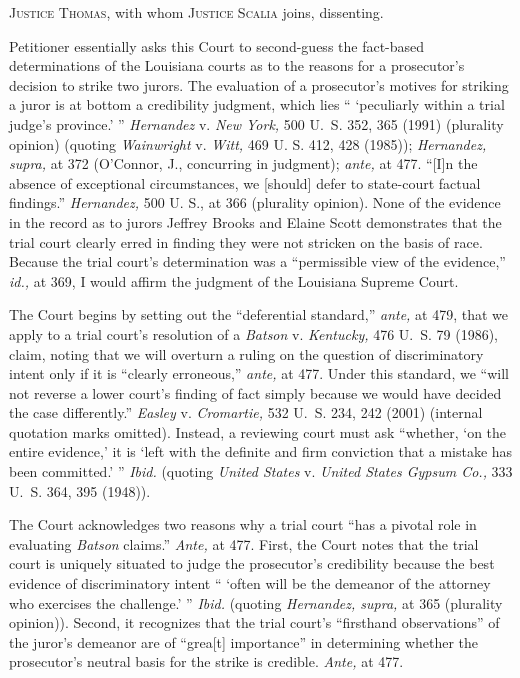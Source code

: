 
\setcounter{page}{486}

  \textsc{Justice Thomas,} with whom \textsc{Justice Scalia} joins, dissenting.

  Petitioner essentially asks this Court to second-guess the fact-based
determinations of the Louisiana courts as to the reasons for a
prosecutor's decision to strike two jurors. The evaluation of a
prosecutor's motives for striking a juror is at bottom a credibility
judgment, which lies `` ‘peculiarly within a trial judge's
province.' '' \emph{Hernandez} v. \emph{New York,} 500 U.~S. 352, 365
(1991) (plurality opinion) (quoting \emph{Wainwright} v. \emph{Witt,} 469
U. S. 412, 428 (1985)); \emph{Hernandez, supra,} at 372 (O'Connor, J.,
concurring in judgment); \emph{ante,} at 477. ``[I]n the absence of
exceptional circumstances, we [should] defer to state-court factual
findings.'' \emph{Hernandez,} 500 U. S., at 366 (plurality opinion).
None of the evidence in the record as to jurors Jeffrey Brooks and
Elaine Scott demonstrates that the trial court clearly erred in finding
they were not stricken on the basis of race. Because the trial court's
determination was a ``permissible view of the evidence,'' \emph{id.,}
at 369, I would affirm the judgment of the Louisiana Supreme Court.

  The Court begins by setting out the ``deferential standard,''
\emph{ante,} at 479, that we apply to a trial court's resolution of
a \emph{Batson} v. \emph{Kentucky,} 476 U.~S. 79 (1986), claim, noting
that we will overturn a ruling on the question of discriminatory intent
only if it is ``clearly erroneous,'' \emph{ante,} at 477. Under this
standard, we ``will not reverse a lower court's \newpage  finding of
fact simply because we would have decided the case differently.''
\emph{Easley} v. \emph{Cromartie,} 532 U.~S. 234, 242 (2001) (internal
quotation marks omitted). Instead, a reviewing court must ask
``whether, ‘on the entire evidence,' it is ‘left with the
definite and firm conviction that a mistake has been committed.' ''
\emph{Ibid.} (quoting \emph{United States} v. \emph{United States Gypsum Co.,}
333 U.~S. 364, 395 (1948)).

  The Court acknowledges two reasons why a trial court ``has a pivotal
role in evaluating \emph{Batson} claims.'' \emph{Ante,} at 477. First,
the Court notes that the trial court is uniquely situated to judge the
prosecutor's credibility because the best evidence of discriminatory
intent `` ‘often will be the demeanor of the attorney who exercises
the challenge.' '' \emph{Ibid.} (quoting \emph{Hernandez, supra,} at 365
(plurality opinion)). Second, it recognizes that the trial court's
``firsthand observations'' of the juror's demeanor are of ``grea[t]
importance'' in determining whether the prosecutor's neutral basis
for the strike is credible. \emph{Ante,} at 477.

